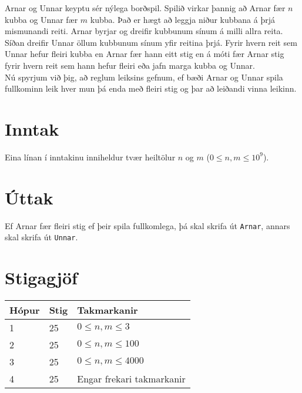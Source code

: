 
Arnar og Unnar keyptu sér nýlega borðspil. Spilið virkar þannig að Arnar
fær $n$ kubba og Unnar fær $m$ kubba. 
Það er hægt að leggja niður kubbana á þrjá mismunandi reiti.
Arnar byrjar og dreifir kubbunum sínum á milli allra reita. Síðan dreifir Unnar öllum kubbunum sínum yfir
reitina þrjá. Fyrir hvern reit sem Unnar hefur fleiri kubba en Arnar fær hann eitt stig en á móti fær Arnar
stig fyrir hvern reit sem hann hefur fleiri eða jafn marga kubba og Unnar. \\

Nú spyrjum við þig, að reglum leiksins gefnum, ef bæði Arnar og Unnar spila fullkominn leik
hver mun þá enda með fleiri stig og þar að leiðandi vinna leikinn.

\section*{Inntak}
Eina línan í inntakinu inniheldur tvær heiltölur $n$ og $m$ ($0 \leq n, m \leq 10^9$). \\

\section*{Úttak}
Ef Arnar fær fleiri stig ef þeir spila fullkomlega, þá skal skrifa út \texttt{Arnar}, annars
skal skrifa út \texttt{Unnar}. \\

\section*{Stigagjöf}
\begin{tabular}{|l|l|l|}
\hline
Hópur & Stig & Takmarkanir \\ \hline
1     & 25   & $0 \leq n,m \leq 3$ \\ \hline
2     & 25   & $0 \leq n,m \leq 100$ \\ \hline
3     & 25   & $0 \leq n,m \leq 4000$ \\ \hline
4     & 25   & Engar frekari takmarkanir \\ \hline
\end{tabular}

